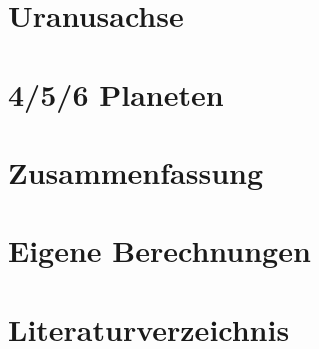 \documentclass[10pt,a4paper,twoside]{article}
\begin{document}
\section{Uranusachse}
\section{4/5/6 Planeten}
\section{Zusammenfassung}

\newpage
\renewcommand{\thesection}{\Alph{section}}
\setcounter{section}{0} 
\section{Eigene Berechnungen}
\section{Literaturverzeichnis}

{}

\end{document}
